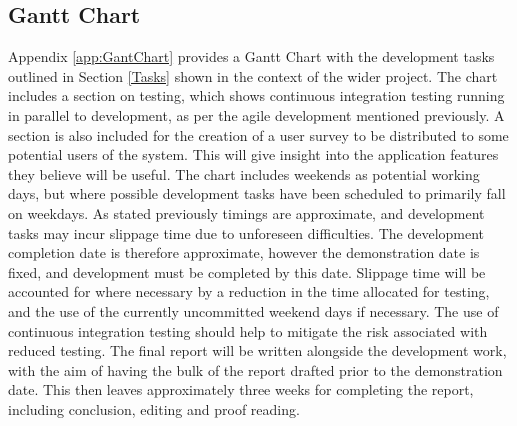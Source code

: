 \documentclass[hidelinks,10pt]{article}
\begin{document}
\subsection{Gantt Chart}\label{GanttChart}
Appendix \ref{app:GantChart} provides a Gantt Chart with the development tasks outlined in Section \ref{Tasks} shown in the context of the wider project. The chart includes a section on testing, which shows continuous integration testing running in parallel to development, as per the agile development mentioned previously. A section is also included for the creation of a user survey to be distributed to some potential users of the system. This will give insight into the application features they believe will be useful. The chart includes weekends as potential working days, but where possible development tasks have been scheduled to primarily fall on weekdays. As stated previously timings are approximate, and development tasks may incur slippage time due to unforeseen difficulties. The development completion date is therefore approximate, however the demonstration date is fixed, and development must be completed by this date. Slippage time will be accounted for where necessary by a reduction in the time allocated for testing, and the use of the currently uncommitted weekend days if necessary. The use of continuous integration testing should help to mitigate the risk associated with reduced testing. The final report will be written alongside the development work, with the aim of having the bulk of the report drafted prior to the demonstration date. This then leaves approximately three weeks for completing the report, including conclusion, editing and proof reading.
\end{document}
